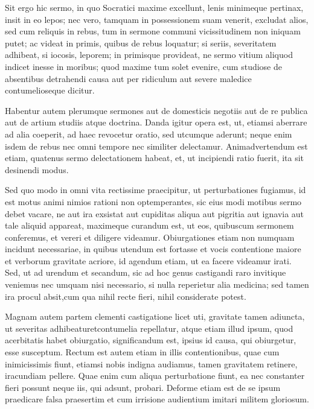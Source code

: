  Sit ergo hic sermo, in quo Socratici maxime excellunt, lenis minimeque pertinax, insit in eo lepos; nec vero, tamquam in possessionem suam venerit, excludat alios, sed cum reliquis in rebus, tum in sermone communi vicissitudinem non iniquam putet; ac videat in primis, quibus de rebus loquatur; si seriis, severitatem adhibeat, si iocosis, leporem; in primisque provideat, ne sermo vitium aliquod indicet inesse in moribus; quod maxime tum solet evenire, cum studiose de absentibus detrahendi causa aut per ridiculum aut severe maledice contumelioseque dicitur.

 Habentur autem plerumque sermones aut de domesticis negotiis aut de re publica aut de artium studiis atque doctrina. Danda igitur opera est, ut, etiamsi aberrare ad alia coeperit, ad haec revocetur oratio, sed utcumque aderunt; neque enim isdem de rebus nec omni tempore nec similiter delectamur. Animadvertendum est etiam, quatenus sermo delectationem habeat, et, ut incipiendi ratio fuerit, ita sit desinendi modus.

 Sed quo modo in omni vita rectissime praecipitur, ut perturbationes fugiamus, id est motus animi nimios rationi non optemperantes, sic eius modi motibus sermo debet vacare, ne aut ira exsistat aut cupiditas aliqua aut pigritia aut ignavia aut tale aliquid appareat, maximeque curandum est, ut eos, quibuscum sermonem conferemus, et vereri et diligere videamur. Obiurgationes etiam non numquam incidunt necessariae, in quibus utendum est fortasse et vocis contentione maiore et verborum gravitate acriore, id agendum etiam, ut ea facere videamur irati. Sed, ut ad urendum et secandum, sic ad hoc genus castigandi raro invitique veniemus nec umquam nisi necessario, si nulla reperietur alia medicina; sed tamen ira procul absit,cum qua nihil recte fieri, nihil considerate potest.

 Magnam autem partem clementi castigatione licet uti, gravitate tamen adiuncta, ut severitas adhibeaturetcontumelia repellatur, atque etiam illud ipsum, quod acerbitatis habet obiurgatio, significandum est, ipsius id causa, qui obiurgetur, esse susceptum. Rectum est autem etiam in illis contentionibus, quae cum inimicissimis fiunt, etiamsi nobis indigna audiamus, tamen gravitatem retinere, iracundiam pellere. Quae enim cum aliqua perturbatione fiunt, ea nec constanter fieri possunt neque iis, qui adsunt, probari. Deforme etiam est de se ipsum praedicare falsa praesertim et cum irrisione audientium imitari militem gloriosum.

